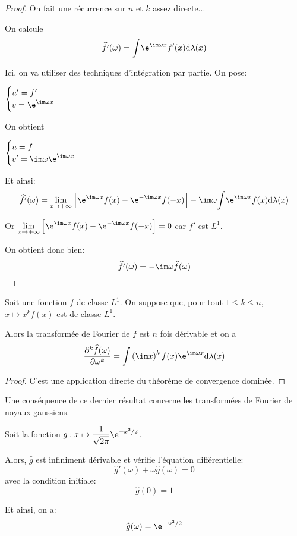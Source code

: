 \begin{proof}
On fait une récurrence sur $n$ et $k$ assez directe...

On calcule
\[
\widehat{f'}(\omega) =  \displaystyle{\int} \e^{\im \omega x} f'(x) \mathrm d \lambda(x)
\]

Ici, on va utiliser des techniques d'intégration par partie. On pose:

$
\begin{cases}
u' = f' \\
v =  \e^{\im \omega x}
\end{cases}
$

On obtient

$
\begin{cases}
u = f \\
v' =  \im \omega \e^{\im \omega x}
\end{cases}
$

Et ainsi:
\[
\widehat{f'}(\omega) = \lim \limits_{x \to +\infty} \left[\e^{\im \omega x} f(x)-\e^{-\im \omega x} f(-x)\right] - \im \omega \displaystyle{\int} \e^{\im \omega x} f(x) \mathrm d \lambda(x)
\]

Or $\lim \limits_{x \to +\infty} \left[\e^{\im \omega x} f(x)-\e^{-\im \omega x} f(-x)\right] = 0$ car $f'$ est $L^1$.

On obtient donc bien:
\[
\widehat{f'}(\omega) = - \im \omega \widehat{f}(\omega)
\]
\end{proof}

\begin{prop}
Soit une fonction $f$ de classe $L^1$. On suppose que, pour tout $1 \leq k \leq n$, $x \mapsto x^k f(x)$ est de classe $L^1$.

Alors la transformée de Fourier de $f$ est $n$ fois dérivable et on a 
\[
\dfrac{\partial ^k \widehat{f}(\omega)}{\partial \omega^k} = \displaystyle{\int} \left(\im x\right)^k f(x) \e^{\im \omega x} \mathrm d \lambda(x)
\]
\end{prop}

\begin{proof}
C'est une application directe du théorème de convergence dominée.
\end{proof}

Une conséquence de ce dernier résultat concerne les transformées de Fourier de noyaux gaussiens.

\begin{prop}
Soit la fonction $g : x \mapsto \dfrac{1}{\sqrt{2 \pi}} \e^{-x^2/2}$.

Alors, $\widehat{g}$ est infiniment dérivable et vérifie l'équation différentielle:
\[
\widehat{g}'(\omega) + \omega \widehat{g}(\omega) = 0
\]
avec la condition initiale:
\[
\widehat{g}(0)=1
\]

Et ainsi, on a:
\[
\widehat{g}(\omega) = \e^{-\omega^2/2}
\]
\end{prop}


